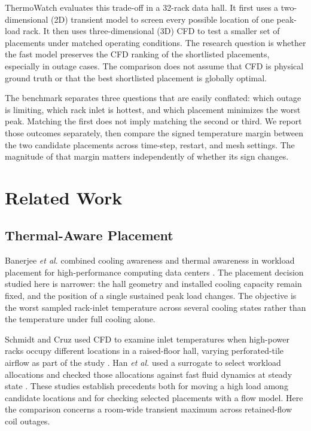 \documentclass{ieeeaccess}
\begin{document}
ThermoWatch evaluates this trade-off in a 32-rack data hall. It first uses a two-dimensional (2D) transient model to screen every possible location of one peak-load rack. It then uses three-dimensional (3D) CFD to test a smaller set of placements under matched operating conditions. The research question is whether the fast model preserves the CFD ranking of the shortlisted placements, especially in outage cases. The comparison does not assume that CFD is physical ground truth or that the best shortlisted placement is globally optimal.

The benchmark separates three questions that are easily conflated: which outage is limiting, which rack inlet is hottest, and which placement minimizes the worst peak. Matching the first does not imply matching the second or third. We report those outcomes separately, then compare the signed temperature margin between the two candidate placements across time-step, restart, and mesh settings. The magnitude of that margin matters independently of whether its sign changes.

\section{Related Work}
\subsection{Thermal-Aware Placement}
Banerjee \emph{et al.} combined cooling awareness and thermal awareness in workload placement for high-performance computing data centers \cite{banerjee2011}. The placement decision studied here is narrower: the hall geometry and installed cooling capacity remain fixed, and the position of a single sustained peak load changes. The objective is the worst sampled rack-inlet temperature across several cooling states rather than the temperature under full cooling alone.

Schmidt and Cruz used CFD to examine inlet temperatures when high-power racks occupy different locations in a raised-floor hall, varying perforated-tile airflow as part of the study \cite{schmidt2002}. Han \emph{et al.} used a surrogate to select workload allocations and checked those allocations against fast fluid dynamics at steady state \cite{han2019}. These studies establish precedents both for moving a high load among candidate locations and for checking selected placements with a flow model. Here the comparison concerns a room-wide transient maximum across retained-flow coil outages.
\end{document}
